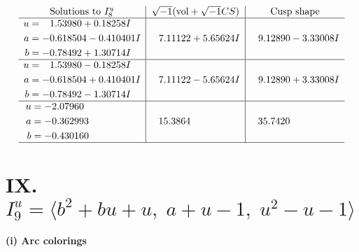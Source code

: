\documentclass[1p]{elsarticle_modified}
\theoremstyle{definition}
\newcommand{\I}{\sqrt{-1}}
\begin{document}
$$\begin{array}{c|c|c}  
\text{Solutions to }I^u_{8}& \I (\text{vol} + \sqrt{-1}CS) & \text{Cusp shape}\\
 \hline 
\begin{aligned}
u &= \phantom{-}1.53980 + 0.18258 I \\
a &= -0.618504 - 0.410401 I \\
b &= -0.78492 + 1.30714 I\end{aligned}
 & \phantom{-}7.11122 + 5.65624 I & \phantom{-}9.12890 - 3.33008 I \\ \hline\begin{aligned}
u &= \phantom{-}1.53980 - 0.18258 I \\
a &= -0.618504 + 0.410401 I \\
b &= -0.78492 - 1.30714 I\end{aligned}
 & \phantom{-}7.11122 - 5.65624 I & \phantom{-}9.12890 + 3.33008 I \\ \hline\begin{aligned}
u &= -2.07960\phantom{ +0.000000I} \\
a &= -0.362993\phantom{ +0.000000I} \\
b &= -0.430160\phantom{ +0.000000I}\end{aligned}
 & \phantom{-}15.3864\phantom{ +0.000000I} & \phantom{-}35.7420\phantom{ +0.000000I}\\
 \hline 
 \end{array}$$\newpage\newpage\renewcommand{\arraystretch}{1}
\centering \section*{IX. $I^u_{9}= \langle b^2+b u+u,\;a+u-1,\;u^2- u-1 \rangle$}
\flushleft \textbf{(i) Arc colorings}\\
\end{document}
